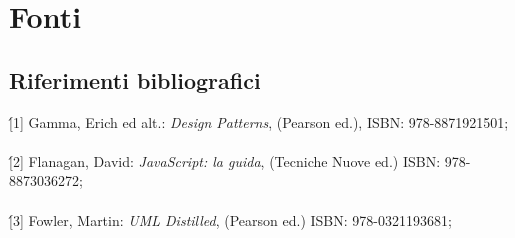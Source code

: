 \newpage
\chapter{Fonti}
\label{cap:bibliografia}



\section*{Riferimenti bibliografici}
\'[1]  Gamma, Erich ed alt.: \emph{Design Patterns}, (Pearson ed.), ISBN: 978-8871921501;\\
\\
\'[2]  Flanagan, David: \emph{JavaScript: la guida}, (Tecniche Nuove ed.) ISBN: 978-8873036272;\\
\\
\'[3]  Fowler, Martin: \emph{UML Distilled}, (Pearson ed.) ISBN: 978-0321193681;\\
